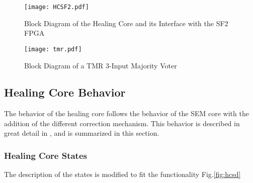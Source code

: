 \begin{figure}[!ht]
    \centering
        \texttt{[image: HCSF2.pdf]}
        \caption{Block Diagram of the Healing Core and its Interface with the SF2 FPGA}
    \label{fig:HCSF2}
\end{figure}

\begin{figure}[!ht]
    \centering
        \texttt{[image: tmr.pdf]}
        \caption{Block Diagram of a TMR 3-Input Majority Voter}
    \label{fig:tmrvoter}
\end{figure}

\subsection{Healing Core Behavior}
\label{label:hbehav}
The behavior of the healing core follows the behavior of the SEM core with the addition of the different correction mechanism. This behavior is described in great detail in \cite{SEM.Xilinx-15}, and is summarized in this section.

\subsubsection{Healing Core States}
The description of the states is modified to fit the functionality
Fig.\ref{fig:hcsd}

